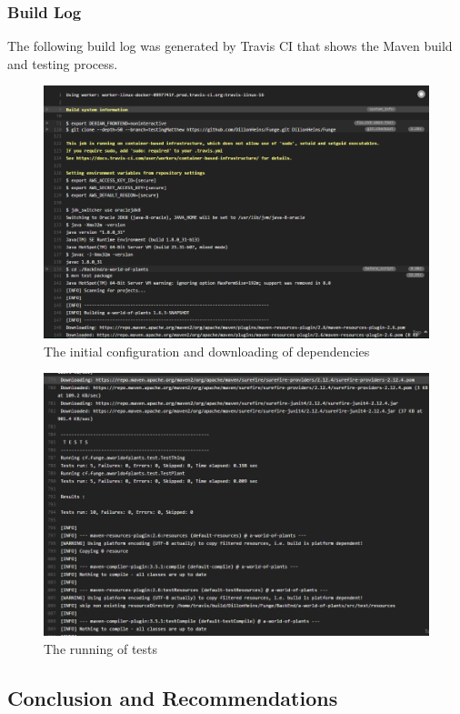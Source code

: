 \documentclass{article}
\begin{document}
		\subsubsection{Build Log}
		The following build log was generated by Travis CI that shows the Maven build and testing process.
		\begin{figure}[H]
			\includegraphics[width=\linewidth]{images/travis1}
			\caption{The initial configuration and downloading of dependencies}
		\end{figure}
		\begin{figure}[H]
			\includegraphics[width=\linewidth]{images/travis2}
			\caption{The running of tests}
		\end{figure}
	\subsection{Conclusion and Recommendations}
\end{document}
